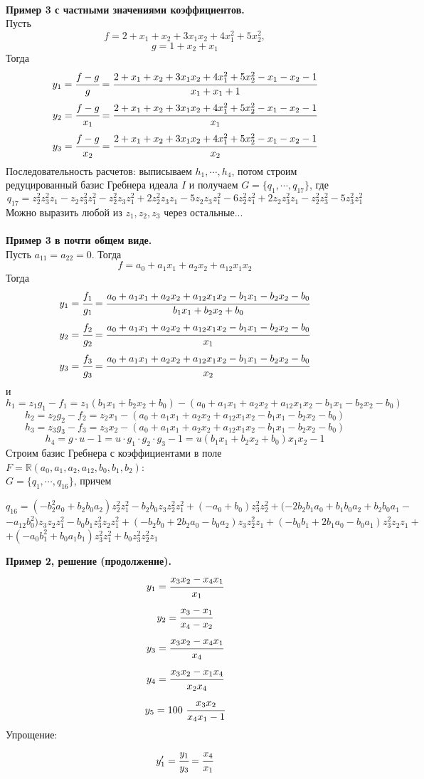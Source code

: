 \documentclass[12pt]{article}
\theoremstyle{definition}
\numberwithin{equation}{section}
\begin{document}
\\
\textbf{Пример 3 с частными значениями коэффициентов.}\\
Пусть $$f=2+x_1+x_2+3x_1x_2+4x_1^2+5x_2^2,$$
$$g=1+x_2+x_1$$
Тогда $$y_1=\cfrac{f-g}{g}=\cfrac{2+x_1+x_2+3x_1x_2+4x_1^2+5x_2^2-x_1-x_2-1}{x_1+x_1+1}$$
$$y_2=\cfrac{f-g}{x_1}=\cfrac{2+x_1+x_2+3x_1x_2+4x_1^2+5x_2^2-x_1-x_2-1}{x_1}$$
$$y_3=\cfrac{f-g}{x_2}=\cfrac{2+x_1+x_2+3x_1x_2+4x_1^2+5x_2^2-x_1-x_2-1}{x_2}$$
Последовательность расчетов: выписываем $h_1, \cdots, h_4$, потом строим редуцированный базис Гребнера идеала $I$ и получаем $G=\{q_1, \cdots, q_{17}\}$, где $$q_{17}=z_2^2z_3^2z_1-z_2z_3^2z_1^2-z_2^2z_3z_1^2+2z_2^2z_3z_1-5z_2z_3z_1^2-6z_2^2z_1^2+2z_2z_3^2z_1-z_2^2z_3^2-5z_3^2z_1^2$$
Можно выразить любой из $z_1, z_2, z_3$ через остальные...\\
\\
\textbf{Пример 3 в почти общем виде.}\\
Пусть $a_{11}=a_{22}=0$. Тогда
$$f=a_0+a_1x_1+a_2x_2+a_{12}x_1x_2$$
Тогда
$$y_1=\cfrac{f_1}{g_1}=\cfrac{a_0+a_1x_1+a_2x_2+a_{12}x_1x_2-b_1x_1-b_2x_2-b_0}{b_1x_1+b_2x_2+b_0}$$
$$y_2=\cfrac{f_2}{g_2}=\cfrac{a_0+a_1x_1+a_2x_2+a_{12}x_1x_2-b_1x_1-b_2x_2-b_0}{x_1}$$
$$y_3=\cfrac{f_3}{g_3}=\cfrac{a_0+a_1x_1+a_2x_2+a_{12}x_1x_2-b_1x_1-b_2x_2-b_0}{x_2}$$
и $$h_1=z_1g_1-f_1=z_1(b_1x_1+b_2x_2+b_0)-(a_0+a_1x_1+a_2x_2+a_{12}x_1x_2-b_1x_1-b_2x_2-b_0)$$
$$h_2=z_2g_2-f_2=z_2x_1-(a_0+a_1x_1+a_2x_2+a_{12}x_1x_2-b_1x_1-b_2x_2-b_0)$$
$$h_3=z_3g_3-f_3=z_3x_2-(a_0+a_1x_1+a_2x_2+a_{12}x_1x_2-b_1x_1-b_2x_2-b_0)$$
$$h_4=g\cdot u-1=u \cdot g_1\cdot g_2\cdot g_3-1=u(b_1x_1+b_2x_2+b_0)x_1x_2-1$$
Строим базис Гребнера с коэффициентами в поле $F=\mathbb{R}(a_0, a_1, a_2, a_{12}, b_0, b_1, b_2):$\\$G=\{q_1, \cdots, q_{16}\}$, причем
\begin{center}
$q_{16}=(-b_2^2a_0+b_2b_0a_2)z_2^2z_1^2-b_2b_0z_3z_2^2z_1^2+(-a_0+b_0)z_3^2z_2^2+(-2b_2b_1a_0+b_1b_0a_2+b_2b_0a_1-$\\
$-a_{12}b_0^2)z_3z_2z_1^2-b_0b_1z_3^2z_2z_1^2+(-b_2b_0+2b_2a_0-b_0a_2)z_3z_2^2z_1+(-b_0b_1+2b_1a_0-b_0a_1)z_3^2z_2z_1+$\\
$+(-a_0b_1^2+b_0a_1b_1)z_3^2z_1^2+b_0z_3^2z_2^2z_1$
\end{center}
\textbf{Пример 2, решение (продолжение).}\\
$$y_1=\cfrac{x_3x_2-x_4x_1}{x_1}$$
$$y_2=\cfrac{x_3-x_1}{x_4-x_2}$$
$$y_3=\cfrac{x_3x_2-x_4x_1}{x_4}$$
$$y_4=\cfrac{x_3x_2-x_1x_4}{x_2x_4}$$
$$y_5=100~\cfrac{x_3x_2}{x_4x_1-1}$$
Упрощение:
$$y_1'=\cfrac{y_1}{y_3}=\cfrac{x_4}{x_1}$$
\end{document}
